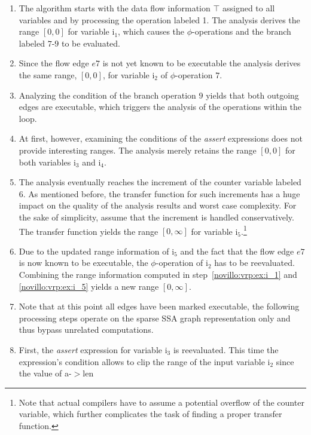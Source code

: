 \begin{enumerate}
\item \label{novillo:vrp:ex:i_1} The algorithm starts with the data flow
      information $\top$ assigned to all variables and by processing the
      operation labeled 1. The analysis derives the range $[0,0]$ for variable
      i$_1$, which causes the $\phi$-operations and the branch labeled $7$-$9$
      to be evaluated.
\item Since the flow edge $e7$ is not yet known to be executable the analysis
      derives the same range, $[0, 0]$, for variable i$_2$ of $\phi$-operation
      $7$.
\item Analyzing the condition of the branch operation $9$ yields that both
      outgoing edges are executable, which triggers the analysis of the
      operations within the loop.
\item At first, however, examining the conditions of the \emph{assert}
      expressions does not provide interesting ranges. The analysis merely
      retains the range $[0, 0]$ for both variables i$_3$ and i$_4$.
\item \label{novillo:vrp:ex:i_5} The analysis eventually reaches the increment
      of the counter variable labeled $6$. As mentioned before, the transfer
      function for such increments has a huge impact on the quality of the
      analysis results and worst case complexity. For the sake of simplicity,
      assume that the increment is handled conservatively. The transfer function
      yields the range $[0, \infty]$ for variable i$_5$.\footnote{Note that
      actual compilers have to assume a potential overflow of the counter
      variable, which further complicates the task of finding a proper transfer
      function.}
\item Due to the updated range information of i$_5$ and the fact that the flow
      edge $e7$ is now known to be executable, the $\phi$-operation of i$_2$ has
      to be reevaluated. Combining the range information computed in
      step~\ref{novillo:vrp:ex:i_1} and \ref{novillo:vrp:ex:i_5} yields a new
      range $[0, \infty]$.
\item Note that at this point all edges have been marked executable, the
      following processing steps operate on the sparse SSA graph representation
      only and thus bypass unrelated computations.
\item \label{novillo:vrp:ex:i_3} First, the \emph{assert} expression for
      variable i$_3$ is reevaluated. This time the expression's condition allows
      to clip the range of the input variable i$_2$ since the value of a-$>$len

\end{enumerate}
